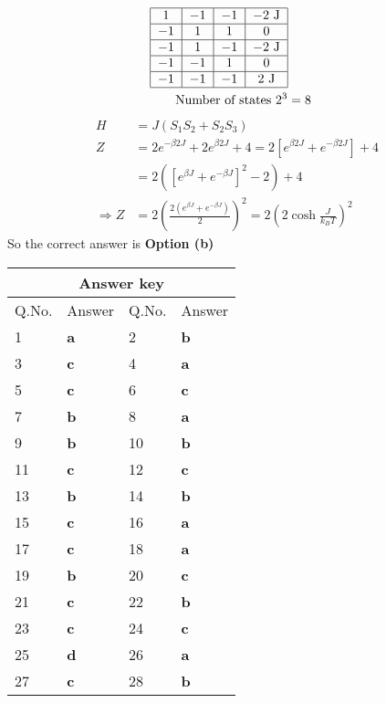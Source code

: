 \begin{enumerate}
\begin{answer}
\begin{align*}
\begin{tabular}{|c|c|c|c|}
	\hline 1 & $-1$ & $-1$ & $-2 \mathrm{~J}$ \\
	\hline$-1$ & 1 & 1 & 0 \\
	\hline$-1$ & 1 & $-1$ & $-2 \mathrm{~J}$ \\
	\hline$-1$ & $-1$ & 1 & 0 \\
	\hline$-1$ & $-1$ & $-1$ & $2 \mathrm{~J}$ \\
	\hline
	\end{tabular}\\
	\text{Number of states }2^{3}&=8\\
	\end{align*}
	\begin{align*}
	H&=J\left(S_{1} S_{2}+S_{2} S_{3}\right)\\
	Z&=2 e^{-\beta 2 J}+2 e^{\beta 2 J}+4=2\left[e^{\beta 2 J}+e^{-\beta 2 J}\right]+4\\&=2\left(\left[e^{\beta J}+e^{-\beta J}\right]^{2}-2\right)+4\\
	\Rightarrow Z&=2\left(\frac{2\left(e^{\beta J}+e^{-\beta J}\right)}{2}\right)^{2}=2\left(2 \cosh \frac{J}{k_{B} T}\right)^{2}
	\end{align*}
	So the correct answer is \textbf{Option (b)}
\end{answer}
\end{enumerate}
\setlength\arrayrulewidth{1pt}
\begin{table}[H]
	\centering
	\begin{tabular}{|p{1.5cm}|p{1.5cm}||p{1.5cm}|p{1.5cm}|}
		\hline
		\multicolumn{4}{|c|}{\textbf{Answer key}}\\\hline\hline
		\rowcolor{ocrel}Q.No.&Answer&Q.No.&Answer\\\hline
		1&\textbf{a} &2&\textbf{b}\\\hline
		3&\textbf{c} &4&\textbf{a} \\\hline
		5&\textbf{c} &6&\textbf{c} \\\hline
		7&\textbf{b}&8&\textbf{a}\\\hline
		9&\textbf{b}&10&\textbf{b}\\\hline
		11&\textbf{c} &12&\textbf{c}\\\hline
		13&\textbf{b}&14&\textbf{b}\\\hline
		15&\textbf{c}&16 &\textbf{a}\\\hline
		17&\textbf{c}&18 &\textbf{a}\\\hline
		19&\textbf{b}&20&\textbf{c}\\\hline
		21&\textbf{c} &22&\textbf{b}\\\hline
		23&\textbf{c}&24&\textbf{c}\\\hline
		25&\textbf{d}&26 &\textbf{a}\\\hline
		27&\textbf{c}&28 &\textbf{b}\\\hline
	\end{tabular}
\end{table}
